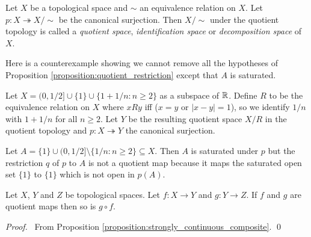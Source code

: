 \begin{definition}
    Let $X$ be a topological space and $\sim$ an equivalence relation on $X$. Let $p : X \twoheadrightarrow X / \sim$ be the canonical surjection.
    Then $X / \sim$ under the quotient topology is called a \emph{quotient space}, \emph{identification space} or \emph{decomposition space} of $X$.
\end{definition}

Here is a counterexample showing we cannot remove all the hypotheses of
Proposition \ref{proposition:quotient_restriction} except that $A$ is saturated.

\begin{example}
    \label{example:quotient_restriction}
    Let $X=(0,1/2] \cup \{1\} \cup \{1+1/n:n \geq 2\}$ as a subspace of $\mathbb{R}$. 
    Define $R$ to be the equivalence relation on $X$ where $xRy$ iff 
    ($x=y$ or $|x - y|=1$), so we identify $1/n$ with $1+1/n$ for all $n \geq 2$. 
    Let $Y$ be the resulting quotient space $X/R$ in the quotient topology
    and $p : X \twoheadrightarrow Y$ the canonical surjection.
    
    Let $A=\{1\} \cup (0 ,1/2] \setminus \{1/n:n \geq 2\} \subseteq X$.
    Then $A$ is saturated under $p$ but the restriction $q$ of $p$ to $A$
    is not a quotient map because it maps the saturated open set $\{1\}$
    to $\{1\}$ which is not open in $p(A)$.
\end{example}

\begin{proposition}
    Let $X$, $Y$ and $Z$ be topological spaces. Let $f : X \rightarrow Y$ and $g : Y \rightarrow Z$. If $f$ and $g$ are quotient maps then so is $g \circ f$.
\end{proposition}

\begin{proof}
    \pf\ From Proposition \ref{proposition:strongly_continuous_composite}. \qed
\end{proof}

